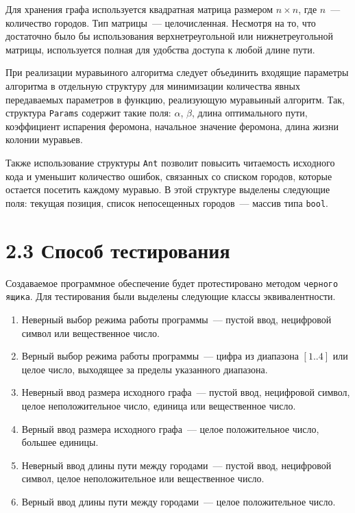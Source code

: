\documentclass[12pt, a4paper]{report}
\begin{document}
	Для хранения графа используется квадратная матрица размером $n \times n$, где $n$~--- количество городов. Тип матрицы~--- целочисленная. Несмотря на то, что достаточно было бы использования верхнетреугольной или нижнетреугольной матрицы, используется полная для удобства доступа к любой длине пути.
	
	При реализации муравьиного алгоритма следует объединить входящие параметры алгоритма в отдельную структуру для минимизации количества явных передаваемых параметров в функцию, реализующую муравьиный алгоритм. Так, структура \verb|Params| содержит такие поля: $\alpha$, $\beta$, длина оптимального пути, коэффициент испарения феромона, начальное значение феромона, длина жизни колонии муравьев.
	
	Также использование структуры \verb|Ant| позволит повысить читаемость исходного кода и уменьшит количество ошибок, связанных со списком городов, которые остается посетить каждому муравью. В этой структуре выделены следующие поля: текущая позиция, список непосещенных городов~--- массив типа \verb|bool|.
	
	\section*{2.3 Способ тестирования}
	
	Создаваемое программное обеспечение будет протестировано методом \verb|черного ящика|. Для тестирования были выделены следующие классы эквивалентности.
	\begin{enumerate}
		\item Неверный выбор режима работы программы~--- пустой ввод, нецифровой символ или вещественное число.
		\item Верный выбор режима работы программы~--- цифра из диапазона $[1..4]$ или целое число, выходящее за пределы указанного диапазона.
		\item Неверный ввод размера исходного графа~--- пустой ввод, нецифровой символ, целое неположительное число, единица или вещественное число.
		\item Верный ввод размера исходного графа~--- целое положительное число, большее единицы.
		\item Неверный ввод длины пути между городами~--- пустой ввод, нецифровой символ, целое неположительное или вещественное число.
		\item Верный ввод длины пути между городами~--- целое положительное число.
	\end{enumerate}
\end{document}
